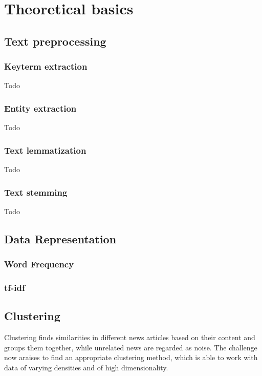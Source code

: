 \section{Theoretical basics}

\subsection{Text preprocessing}

\subsubsection{Keyterm extraction}
Todo

\subsubsection{Entity extraction}
Todo

\subsubsection{Text lemmatization}
Todo

\subsubsection{Text stemming}
Todo

\subsection{Data Representation}

\subsubsection{Word Frequency}

\subsubsection{tf-idf}

\subsection{Clustering}
Clustering finds similarities in different news articles based on their content and groups them together, while unrelated news are regarded as noise. The challenge now araises to find an appropriate clustering method, which is able to work with data of varying densities and of high dimensionality.


